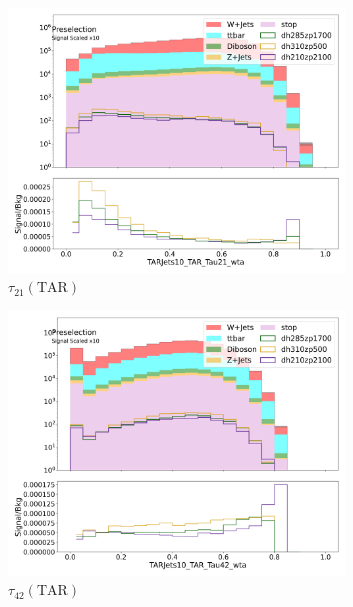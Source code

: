     \begin{figure}[htbp]
      \centering
      \begin{subfigure}{0.49\textwidth}
      \includegraphics[width = 0.98\textwidth]{Figures/appendix/Preselection/TARJets10_TAR_Tau21_wta.png}
      \caption{$\tau_{21}(\text{TAR})$}
      \end{subfigure}
      \begin{subfigure}{0.49\textwidth}
      \includegraphics[width = 0.98\textwidth]{Figures/appendix/Preselection/TARJets10_TAR_Tau42_wta.png}
      \caption{$\tau_{42}(\text{TAR})$}
      \end{subfigure}
         \begin{subfigure}{0.49\textwidth}

\end{subfigure}
\end{figure}
